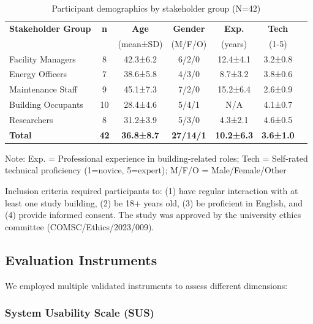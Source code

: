 \documentclass[acmlarge]{acmart}
\begin{document}
\begin{table}[h]
\centering
\begin{threeparttable}
\caption{Participant demographics by stakeholder group (N=42)}
\label{tab:participant-demographics}
\small
\begin{tabular}{@{}lcccccc@{}}
\toprule
\textbf{Stakeholder Group} & \textbf{n} & \textbf{Age} & \textbf{Gender} & \textbf{Exp.} & \textbf{Tech} \\
 & & (mean±SD) & (M/F/O) & (years) & (1-5) \\
\midrule
Facility Managers & 8 & 42.3±6.2 & 6/2/0 & 12.4±4.1 & 3.2±0.8 \\
Energy Officers & 7 & 38.6±5.8 & 4/3/0 & 8.7±3.2 & 3.8±0.6 \\
Maintenance Staff & 9 & 45.1±7.3 & 7/2/0 & 15.2±6.4 & 2.6±0.9 \\
Building Occupants & 10 & 28.4±4.6 & 5/4/1 & N/A & 4.1±0.7 \\
Researchers & 8 & 31.2±3.9 & 5/3/0 & 4.3±2.1 & 4.6±0.5 \\
\midrule
\textbf{Total} & \textbf{42} & \textbf{36.8±8.7} & \textbf{27/14/1} & \textbf{10.2±6.3} & \textbf{3.6±1.0} \\
\bottomrule
\end{tabular}
\begin{tablenotes}
\small
\item Note: Exp. = Professional experience in building-related roles; Tech = Self-rated technical proficiency (1=novice, 5=expert); M/F/O = Male/Female/Other
\end{tablenotes}
\end{threeparttable}
\end{table}

Inclusion criteria required participants to: (1) have regular interaction with at least one study building, (2) be 18+ years old, (3) be proficient in English, and (4) provide informed consent. The study was approved by the university ethics committee (COMSC/Ethics/2023/009).


\subsection{Evaluation Instruments}

We employed multiple validated instruments to assess different dimensions:

\subsubsection{System Usability Scale (SUS)}
\end{document}
